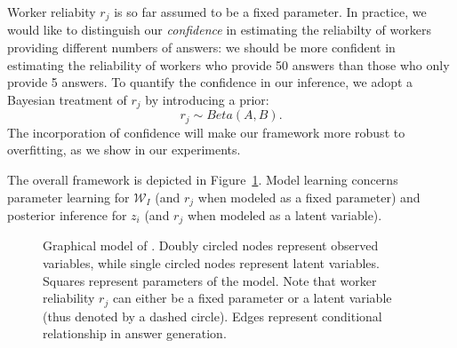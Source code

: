Worker reliabity $r_j$ is so far assumed to be a fixed parameter. In practice, we would like to distinguish our \emph{confidence} in estimating the reliabilty of workers providing different numbers of answers: we should be more confident in estimating the reliability of workers who provide 50 answers than those who only provide 5 answers. To quantify the confidence in our inference, we adopt a Bayesian treatment of $r_j$ by introducing a prior:
%
\begin{equation}
        r_j \sim Beta(A,B).
        \label{eq:rj_dist}
\end{equation}
%
The incorporation of confidence will make our framework more robust to overfitting, as we show in our experiments. 

The overall \sys framework is depicted in Figure~\ref{fig:graphical_model}. Model learning concerns parameter learning for $\mathcal{W}_I$ (and $r_j$ when modeled as a fixed parameter) and posterior inference for $z_i$ (and $r_j$ when modeled as a latent variable).  

\begin{figure}[htb] 
{
}
\caption{Graphical model of \sys. Doubly circled nodes represent observed variables, while single circled nodes represent latent variables.  Squares represent parameters of the model. Note that worker reliability $r_j$ can either be a fixed parameter or a latent variable (thus denoted by a dashed circle). Edges represent conditional relationship in answer generation.}
\label{fig:graphical_model}
\end{figure}


